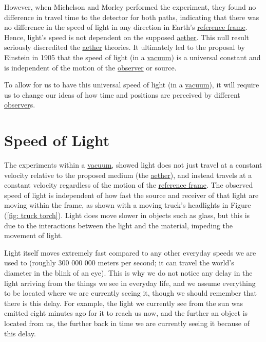 However, when Michelson and Morley performed the experiment, they found no difference in travel time to the detector for both paths, indicating that there was no difference in the speed of light in any direction in Earth's \hyperlink{def-Reference-frame}{reference frame}.
Hence, light's speed is not dependent on the supposed \hyperlink{def-aether}{aether}.
This null result seriously discredited the \hyperlink{def-aether}{aether} theories.
It ultimately led to the proposal by Einstein in 1905 that the speed of light (in a \hyperlink{def-vacuum}{vacuum}) is a universal constant and is independent of the motion of the \hyperlink{def-observer}{observer} or source.

To allow for us to have this universal speed of light (in a \hyperlink{def-vacuum}{vacuum}), it will require us to change our ideas of how time and positions are perceived by different \hyperlink{def-observer}{observer}s.

\section{Speed of Light} \label{sect: Speed of Light}

The experiments within a \hyperlink{def-vacuum}{vacuum}, showed light does not just travel at a constant velocity relative to the proposed medium (the \hyperlink{def-aether}{aether}), and instead travels at a constant velocity regardless of the motion of the \hyperlink{def-Reference-frame}{reference frame}.
The observed speed of light is independent of how fast the source and receiver of that light are moving within the frame, as shown with a moving truck's headlights in Figure (\ref{fig: truck torch}).
Light does move slower in objects such as glass, but this is due to the interactions between the light and the material, impeding the movement of light.

Light itself moves extremely fast compared to any other everyday speeds we are used to (roughly 300 000 000 meters per second; it can travel the world's diameter in the blink of an eye).
This is why we do not notice any delay in the light arriving from the things we see in everyday life, and we assume everything to be located where we are currently seeing it, though we should remember that there is this delay.
For example, the light we currently see from the sun was emitted eight minutes ago for it to reach us now, and the further an object is located from us, the further back in time we are currently seeing it because of this delay.

